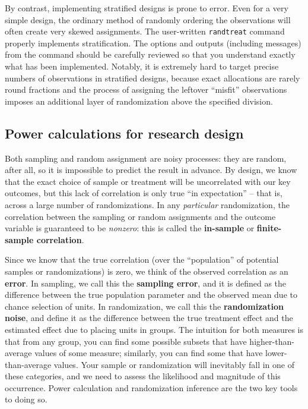 By contrast, implementing stratified designs is prone to error.
Even for a very simple design, the ordinary method of randomly ordering the observations
will often create very skewed assignments.
The user-written \texttt{randtreat} command properly implements stratification.\cite{carril2017dealing}
The options and outputs (including messages) from the command should be carefully reviewed
so that you understand exactly what has been implemented.
Notably, it is extremely hard to target precise numbers of observations
in stratified designs, because exact allocations are rarely round fractions
and the process of assigning the leftover ``misfit'' observations
imposes an additional layer of randomization above the specified division.


\subsection{Power calculations for research design}

Both sampling and random assignment are noisy processes:
they are random, after all, so it is impossible to predict the result in advance.
By design, we know that the exact choice of sample or treatment
will be uncorrelated with our key outcomes,
but this lack of correlation is only true ``in expectation'' --
that is, across a large number of randomizations.
In any \textit{particular} randomization,
the correlation between the sampling or random assignments and the outcome variable
is guaranteed to be \textit{nonzero}:
this is called the \textbf{in-sample} or \textbf{finite-sample correlation}.

Since we know that the true correlation
(over the ``population'' of potential samples or randomizations)
is zero, we think of the observed correlation as an \textbf{error}.
In sampling, we call this the \textbf{sampling error},
and it is defined as the difference between the true population parameter
and the observed mean due to chance selection of units.
In randomization, we call this the \textbf{randomization noise},
and define it as the difference between the true treatment effect
and the estimated effect due to placing units in groups.
The intuition for both measures is that from any group,
you can find some possible subsets that have higher-than-average values of some measure;
similarly, you can find some that have lower-than-average values.
Your sample or randomization will inevitably fall in one of these categories,
and we need to assess the likelihood and magnitude of this occurrence.
Power calculation and randomization inference are the two key tools to doing so.


